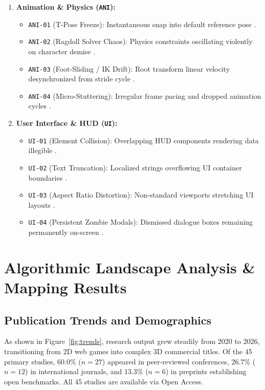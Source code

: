 \documentclass[preprint,12pt,3p]{elsarticle}
\begin{document}
\begin{enumerate}
    \item \textbf{Animation \& Physics (\texttt{ANI}):}
    \begin{itemize}
        \item \texttt{ANI-01} (T-Pose Freeze): Instantaneous snap into default reference pose \cite{taesiri2025videogameqa}.
        \item \texttt{ANI-02} (Ragdoll Solver Chaos): Physics constraints oscillating violently on character demise \cite{muller2026tempglitch, cao2024physgame}.
        \item \texttt{ANI-03} (Foot-Sliding / IK Drift): Root transform linear velocity desynchronized from stride cycle \cite{muller2026tempglitch}.
        \item \texttt{ANI-04} (Micro-Stuttering): Irregular frame pacing and dropped animation cycles \cite{guglielmi2023haste}.
    \end{itemize}

    \item \textbf{User Interface \& HUD (\texttt{UI}):}
    \begin{itemize}
        \item \texttt{UI-01} (Element Collision): Overlapping HUD components rendering data illegible \cite{taesiri2025videogameqa, macklon2022html5bugs}.
        \item \texttt{UI-02} (Text Truncation): Localized strings overflowing UI container boundaries \cite{lu2026howfarvlms, moran2020automated}.
        \item \texttt{UI-03} (Aspect Ratio Distortion): Non-standard viewports stretching UI layouts \cite{chen2025vlmui, roohi2021towards}.
        \item \texttt{UI-04} (Persistent Zombie Modals): Dismissed dialogue boxes remaining permanently on-screen \cite{taesiri2025videogameqa}.
    \end{itemize}
\end{enumerate}

\section{Algorithmic Landscape Analysis \& Mapping Results}

\subsection{Publication Trends and Demographics}
As shown in Figure~\ref{fig:trends}, research output grew steadily from 2020 to 2026, transitioning from 2D web games into complex 3D commercial titles. Of the 45 primary studies, 60.0\% ($n=27$) appeared in peer-reviewed conferences, 26.7\% ($n=12$) in international journals, and 13.3\% ($n=6$) in preprints establishing open benchmarks. All 45 studies are available via Open Access.
\end{document}
